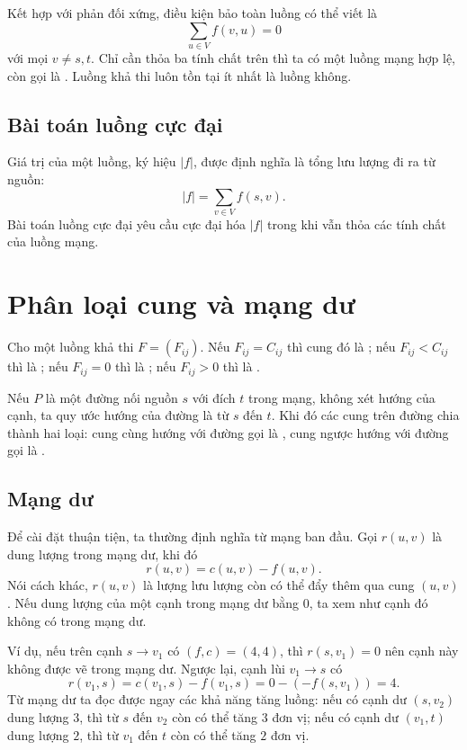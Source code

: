 \documentclass[11pt]{article}
\begin{document}
Kết hợp với phản đối xứng, điều kiện bảo toàn luồng có thể viết là
\[
  \sum_{u\in V} f(v,u)=0
\]
với mọi $v\ne s,t$. Chỉ cần thỏa ba tính chất trên thì ta có một luồng mạng
hợp lệ, còn gọi là . Luồng khả thi luôn tồn tại ít nhất là
luồng không.

\subsection{Bài toán luồng cực đại}

Giá trị của một luồng, ký hiệu $|f|$, được định nghĩa là tổng lưu lượng đi ra
từ nguồn:
\[
  |f|=\sum_{v\in V} f(s,v).
\]
Bài toán luồng cực đại yêu cầu cực đại hóa $|f|$ trong khi vẫn thỏa các tính
chất của luồng mạng.

\section{Phân loại cung và mạng dư}

Cho một luồng khả thi $F=(F_{ij})$. Nếu $F_{ij}=C_{ij}$ thì cung đó là
; nếu $F_{ij}<C_{ij}$ thì là ; nếu
$F_{ij}=0$ thì là ; nếu $F_{ij}>0$ thì là
.

Nếu $P$ là một đường nối nguồn $s$ với đích $t$ trong mạng, không xét hướng của
cạnh, ta quy ước hướng của đường là từ $s$ đến $t$. Khi đó các cung trên
đường chia thành hai loại: cung cùng hướng với đường gọi là ,
cung ngược hướng với đường gọi là .

\subsection{Mạng dư}

Để cài đặt thuận tiện, ta thường định nghĩa  từ mạng ban đầu.
Gọi $r(u,v)$ là dung lượng trong mạng dư, khi đó
\[
  r(u,v)=c(u,v)-f(u,v).
\]
Nói cách khác, $r(u,v)$ là lượng lưu lượng còn có thể đẩy thêm qua cung
$(u,v)$. Nếu dung lượng của một cạnh trong mạng dư bằng $0$, ta xem như cạnh
đó không có trong mạng dư.

Ví dụ, nếu trên cạnh $s\to v_1$ có $(f,c)=(4,4)$, thì
$r(s,v_1)=0$ nên cạnh này không được vẽ trong mạng dư. Ngược lại, cạnh lùi
$v_1\to s$ có
\[
  r(v_1,s)=c(v_1,s)-f(v_1,s)=0-(-f(s,v_1))=4.
\]
Từ mạng dư ta đọc được ngay các khả năng tăng luồng: nếu có cạnh dư
$(s,v_2)$ dung lượng $3$, thì từ $s$ đến $v_2$ còn có thể tăng $3$ đơn vị;
nếu có cạnh dư $(v_1,t)$ dung lượng $2$, thì từ $v_1$ đến $t$ còn có thể tăng
$2$ đơn vị.
\end{document}
